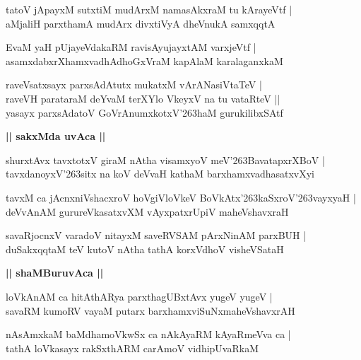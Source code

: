 \documentclass[twoside,12pt,openright]{book}
\def\S{\char'263}
\newcounter{shloka}[chapter]
\def\uvaca#1{\centerline{{\large\textbf{#1}}}}
\begin{document}
\begin{shloka}%
tatoV jApayxM sutxtiM mudArxM namasAkxraM tu kArayeVtf |\\
aMjaliH parxthamA mudArx divxtiVyA dheVnukA samxqqtA 
\end{shloka}

\begin{shloka}%
EvaM yaH pUjayeVdakaRM ravisAyujayxtAM varxjeVtf |\\
asamxdabxrXhamxvadhAdhoGxVraM kapAlaM karalaganxkaM 
\end{shloka}

\begin{shloka}%
raveVsatxsayx parxsAdAtutx mukatxM vArANasiVtaTeV |\\
raveVH parataraM deYvaM terXYlo VkeyxV na tu vataRteV ||\\
yasayx parxsAdatoV GoVrAnumxkotxV\S haM gurukilibxSAtf
\end{shloka}

\uvaca{|| sakxMda uvAca ||}

\begin{shloka}%
shurxtAvx tavxtotxV giraM nAtha visamxyoV meV\S BavatapxrXBoV |\\
tavxdanoyxV\S sitx na koV deVvaH kathaM barxhamxvadhasatxvXyi
\end{shloka}

\begin{shloka}%
tavxM ca jAcnxniVshacxroV hoVgiVloVkeV BoVkAtx\S kaSxroV\S vayxyaH |\\
deVvAnAM gurureVkasatxvXM vAyxpatxrUpiV maheVshavxraH 
\end{shloka}

\begin{shloka}%
savaRjocnxV varadoV nitayxM saveRVSAM pArxNinAM parxBUH |\\
duSakxqqtaM teV kutoV nAtha tathA korxVdhoV visheVSataH 
\end{shloka}

\uvaca{|| shaMBuruvAca ||}

\begin{shloka}%
loVkAnAM ca hitAthARya parxthagUBxtAvx yugeV yugeV |\\
savaRM kumoRV vayaM putarx barxhamxviSuNxmaheVshavxrAH 
\end{shloka}

\begin{shloka}%
nAsAmxkaM baMdhamoVkwSx ca nAkAyaRM kAyaRmeVva ca |\\
tathA loVkasayx rakSxthARM carAmoV vidhipUvaRkaM 
\end{shloka}
\end{document}
